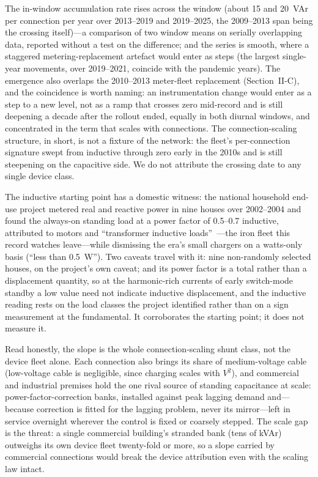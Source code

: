 \documentclass[journal]{IEEEtran}
\begin{document}
The in-window accumulation rate rises across the window (about 15 and 20~VAr
per connection per year over 2013--2019 and 2019--2025, the 2009--2013 span
being the crossing itself)---a comparison of two window means on serially
overlapping data, reported without a test on the difference; and the
series is smooth, where a staggered metering-replacement artefact would enter
as steps (the largest single-year movements, over 2019--2021, coincide with
the pandemic years). The emergence also overlaps the 2010--2013 meter-fleet
replacement (Section~II-C), and the coincidence is worth naming: an
instrumentation change would enter as a step to a new level, not as a ramp
that crosses zero mid-record and is still deepening a decade after the
rollout ended, equally in both diurnal windows, and concentrated in the term
that scales with connections. The connection-scaling structure, in short, is not a fixture of
the network: the fleet's per-connection signature swept from inductive through
zero early in the 2010s and is still steepening on the capacitive side. We do
not attribute the crossing date to any single device class.

The inductive starting point has a domestic witness: the national household end-use project
metered real and reactive power in nine houses over 2002--2004 and found the
always-on standing load at a power factor of 0.5--0.7 inductive, attributed to
motors and ``transformer inductive loads''~\cite{heep_sr155}---the iron fleet
this record watches leave---while dismissing the era's small chargers on a
watts-only basis (``less than 0.5~W''). Two caveats travel with it: nine
non-randomly selected houses, on the project's own caveat; and its power factor
is a total rather than a displacement quantity, so at the harmonic-rich
currents of early switch-mode standby a low value need not indicate inductive
displacement, and the inductive reading rests on the load classes the project
identified rather than on a sign measurement at the fundamental. It corroborates
the starting point; it does not measure it.

Read honestly, the slope is the whole connection-scaling shunt class, not
the device fleet alone. Each connection also brings its share of medium-voltage
cable (low-voltage cable is negligible, since charging scales with $V^2$), and
commercial and industrial premises hold the one rival source of standing
capacitance at scale: power-factor-correction banks, installed against peak
lagging demand and---because correction is fitted for the lagging problem,
never its mirror---left in service overnight wherever the control is fixed or
coarsely stepped. The scale gap is the threat: a single commercial building's
stranded bank (tens of kVAr) outweighs its own device fleet twenty-fold or
more, so a slope carried by commercial connections would break the device
attribution even with the scaling law intact.
\end{document}
